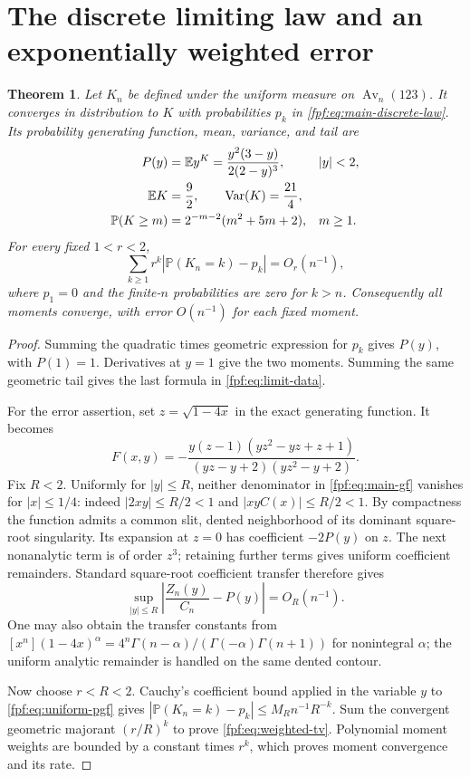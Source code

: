 \documentclass[11pt]{article}
\numberwithin{equation}{section}
\newtheorem{theorem}{Theorem}[section]
\theoremstyle{definition}
\newcommand{\Av}{\operatorname{Av}}
\newcommand{\E}{\mathbb E}
\newcommand{\Prob}{\mathbb P}
\begin{document}
\section{The discrete limiting law and an exponentially weighted error}

\begin{theorem}\label{fpf:thm:limitlaw}
Let $K_n$ be defined under the uniform measure on $\Av_n(123)$. It converges
in distribution to $K$ with probabilities $p_k$ in
\eqref{fpf:eq:main-discrete-law}. Its probability generating function, mean,
variance, and tail are
\begin{align}\label{fpf:eq:limit-data}
 P(y)&=\E y^K=\frac{y^2(3-y)}{2(2-y)^3}, && |y|<2,\notag\\
 \E K&=\frac92,\qquad \operatorname{Var}(K)=\frac{21}4,\notag\\
 \Prob(K\ge m)&=2^{-m-2}(m^2+5m+2), && m\ge1.
\end{align}
For every fixed $1<r<2$,
\begin{equation}\label{fpf:eq:weighted-tv}
 \sum_{k\ge1}r^k
 \left|\Prob(K_n=k)-p_k\right|=O_r(n^{-1}),
\end{equation}
where $p_1=0$ and the finite-$n$ probabilities are zero for $k>n$.
Consequently all moments converge, with error $O(n^{-1})$ for each fixed
moment.
\end{theorem}
\begin{proof}
Summing the quadratic times geometric expression for $p_k$ gives $P(y)$,
with $P(1)=1$. Derivatives at $y=1$ give the two moments. Summing the same
geometric tail gives the last formula in \eqref{fpf:eq:limit-data}.

For the error assertion, set $z=\sqrt{1-4x}$ in the exact generating
function. It becomes
\begin{equation}\label{fpf:eq:F-z}
 F(x,y)=-\frac{y(z-1)(yz^2-yz+z+1)}
                  {(yz-y+2)(yz^2-y+2)}.
\end{equation}
Fix $R<2$. Uniformly for $|y|\le R$, neither denominator in
\eqref{fpf:eq:main-gf} vanishes for $|x|\le1/4$: indeed
$|2xy|\le R/2<1$ and $|xyC(x)|\le R/2<1$. By compactness the function
admits a common slit, dented neighborhood of its dominant square-root
singularity. Its expansion at $z=0$ has coefficient $-2P(y)$ on $z$.
The next nonanalytic term is of order $z^3$; retaining further terms gives
uniform coefficient remainders. Standard square-root coefficient transfer
\cite[Chapter VI]{flajolet} therefore gives
\begin{equation}\label{fpf:eq:uniform-pgf}
 \sup_{|y|\le R}\left|\frac{Z_n(y)}{C_n}-P(y)\right|=O_R(n^{-1}).
\end{equation}
One may also obtain the transfer constants from
$[x^n](1-4x)^\alpha
=4^n\Gamma(n-\alpha)/(\Gamma(-\alpha)\Gamma(n+1))$
for nonintegral $\alpha$; the uniform analytic remainder is handled on the
same dented contour.

Now choose $r<R<2$. Cauchy's coefficient bound applied in the variable $y$
to \eqref{fpf:eq:uniform-pgf} gives
$|\Prob(K_n=k)-p_k|\le M_R n^{-1}R^{-k}$.
Sum the convergent geometric majorant $(r/R)^k$ to prove
\eqref{fpf:eq:weighted-tv}. Polynomial moment weights are bounded by a constant
times $r^k$, which proves moment convergence and its rate.
\end{proof}
\end{document}
